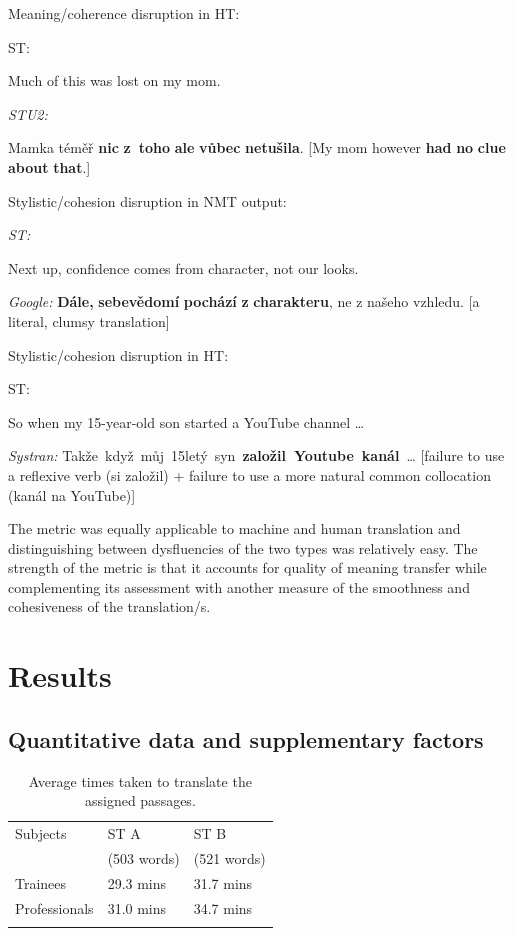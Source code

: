 \documentclass[output=paper]{langscibook}
\begin{document}
\ea
Meaning/coherence disruption in HT:

ST:

{Much of this was lost on my mom.}

\textit{STU2:}

{Mamka téměř \textbf{nic} \textbf{z~toho} \textbf{ale} \textbf{vůbec} \textbf{netušila}. [My mom however \textbf{had} \textbf{no} \textbf{clue} \textbf{about} \textbf{that}.]}
\z

\ea
Stylistic/cohesion disruption in NMT output:

\textit{ST:}

{ Next up, confidence comes from character, not our looks.}

\textit{Google:} \textbf{Dále,} \textbf{sebevědomí} \textbf{pochází} \textbf{z} \textbf{charakteru}, ne z našeho vzhledu. [a literal, clumsy translation]
\z

\ea
Stylistic/cohesion disruption in HT:

ST:

{So when my 15-year-old son started a YouTube channel …}

\textit{Systran:} Takže~když~můj~15letý~syn~\textbf{založil~Youtube~kanál}~… [failure to use a reflexive verb (si založil) + failure to use a more natural common collocation (kanál na YouTube)]
\z

The metric was equally applicable to machine and human translation and distinguishing between dysfluencies of the two types was relatively easy. The strength of the metric is that it accounts for quality of meaning transfer while complementing its assessment with another measure of the smoothness and cohesiveness of the translation/s.

\section{Results}\label{sec:kamenicka:4}

\subsection{Quantitative data and supplementary factors}\label{sec:kamenicka:4.1}

\begin{table}
\begin{tabularx}{\textwidth}{lYY}
\lsptoprule
{{{Subjects}}} & {{{ST A} }}    & {{{ST B} }}\\
& {{(503 words)}} & {{(521 words)}}\\
\midrule
Trainees           & 29.3 mins       & 31.7 mins\\
Professionals       & 31.0 mins       &  34.7 mins\\
\lspbottomrule
\end{tabularx}
\caption{Average times taken to translate the assigned passages.}
\label{tab:kamenicka:1}
\end{table}
\end{document}
